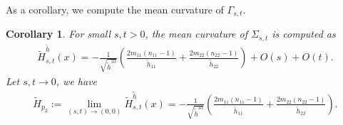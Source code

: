 \documentclass[11pt,letterpaper]{amsart}
\newtheorem{cor}{Corollary}[section]
\begin{document}
As a corollary, we compute the mean curvature of $\Gamma_{s,t}$.
\begin{cor}
    For small $s,t>0$, the mean curvature of $\Sigma_{s,t}$ is computed as
    \begin{align}
        \tilde{H}_{s,t}^{\tilde{h}}(x)=-\frac{1}{\sqrt{\tilde{h}^{33}}}\left(\frac{2m_{11}(n_{11}-1)}{\tilde{h}_{11}}+\frac{2m_{22}(n_{22}-1)}{\tilde{h}_{22}}\right)+O(s)+O(t).
    \end{align}
    Let $s,t\to 0$, we have 
    \begin{align}
\tilde{H}_{p_2}:=\lim_{(s,t)\to(0,0)}\tilde{H}_{s,t}^{\tilde{h}}(x)=-\frac{1}{\sqrt{\tilde{h}^{33}}}\left(\frac{2m_{11}(n_{11}-1)}{\tilde{h}_{11}}+\frac{2m_{22}(n_{22}-1)}{\tilde{h}_{22}}\right).    \end{align}
\end{cor}
\end{document}
